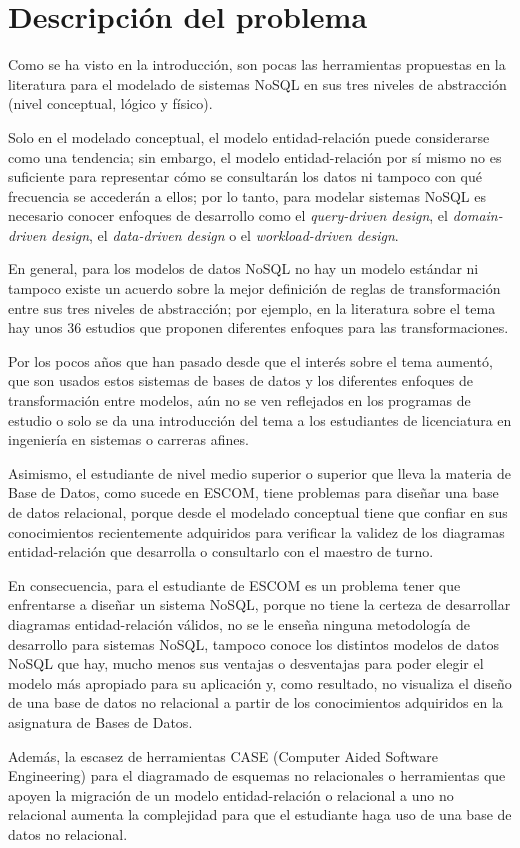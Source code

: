 \section{Descripción del problema}
Como se ha visto en la introducción, son pocas las herramientas propuestas en la literatura para el modelado de sistemas NoSQL en sus tres niveles de abstracción (nivel conceptual, lógico y físico).


Solo en el modelado conceptual, el modelo entidad-relación puede considerarse como una tendencia; sin embargo, el modelo entidad-relación por sí mismo no es suficiente para representar cómo se consultarán los datos ni tampoco con qué frecuencia se accederán a ellos; por lo tanto, para modelar sistemas NoSQL es necesario conocer enfoques de desarrollo como el \textit{query-driven design}, el \textit{domain-driven design}, el \textit{data-driven design} o el \textit{workload-driven design}.


En general, para los modelos de datos NoSQL no hay un modelo estándar ni tampoco existe un acuerdo sobre la mejor definición de reglas de transformación entre sus tres niveles de abstracción; por ejemplo, en la literatura sobre el tema hay unos 36 estudios\cite{martinez-mosquera_modeling_2020} que proponen diferentes enfoques para las transformaciones.


Por los pocos años que han pasado desde que el interés sobre el tema aumentó, que son usados estos sistemas de bases de datos y los diferentes enfoques de transformación entre modelos, aún no se ven reflejados en los programas de estudio o solo se da una introducción del tema a los estudiantes de licenciatura en ingeniería en sistemas o carreras afines. 


Asimismo, el estudiante de nivel medio superior o superior que lleva la materia de Base de Datos, como sucede en ESCOM, tiene problemas para diseñar una base de datos relacional, porque desde el modelado conceptual tiene que confiar en sus conocimientos recientemente adquiridos para verificar la validez de los diagramas entidad-relación que desarrolla o consultarlo con el maestro de turno.


En consecuencia, para el estudiante de ESCOM es un problema tener que enfrentarse a diseñar un sistema NoSQL, porque no tiene la certeza de desarrollar diagramas entidad-relación válidos, no se le enseña ninguna metodología de desarrollo para sistemas NoSQL, tampoco conoce los distintos modelos de datos NoSQL que hay, mucho menos sus ventajas o desventajas para poder elegir el modelo más apropiado para su aplicación y, como resultado, no visualiza el diseño de una base de datos no relacional a partir de los conocimientos adquiridos en la asignatura de Bases de Datos.


Además, la escasez de herramientas CASE (Computer Aided Software Engineering) para el diagramado de esquemas no relacionales o herramientas que apoyen la migración de un modelo entidad-relación o relacional a uno no relacional aumenta la complejidad para que el estudiante haga uso de una base de datos no relacional.
